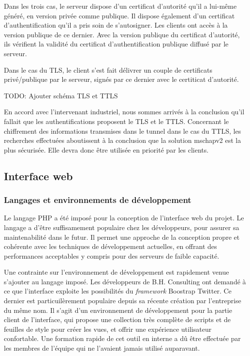 Dans les trois cas, le serveur dispose d'un  certificat d'autorité qu'il a lui-même généré, en version privée comme publique. Il dispose également d'un certificat d'authentification qu'il a pris soin de s'autosigner. Les clients ont accès à la version publique de ce dernier. Avec la version publique du certificat d'autorité, ils vérifient la validité du certificat d'authentification publique diffusé par le serveur.

Dans le cas du TLS, le client s'est fait délivrer un couple de certificats privé/publique par le serveur, signés par ce dernier avec le certiticat d'autorité.

TODO: Ajouter schéma TLS et TTLS

En accord avec l'intervenant industriel, nous sommes arrivés à la conclusion qu'il fallait que les authentifications proposent le TLS et le TTLS. Concernant le chiffrement des informations transmises dans le tunnel dans le cas du TTLS, les recherches effectuées aboutissent à la conclusion que la solution mschapv2 est la plus sécurisée. Elle devra donc être utilisée en priorité par les clients.

\subsection{Interface web}
\subsubsection{Langages et environnements de développement}

Le langage PHP a été imposé pour la conception de l'interface web du projet. Le langage a d'être suffisamement populaire chez les développeurs, pour assurer sa maintenabilité dans le futur. Il permet une approche de la conception propre et cohérente avec les techniques de développement actuelles, en offrant des performances acceptables y compris pour des serveurs de faible capacité.

Une contrainte sur l'environnement de développement est rapidement venue s'ajouter au langage imposé. Les développeurs de B.H. Consulting ont demandé à ce que l'interface exploite les possibilités du \textit{framework} Boostrap Twitter. Ce dernier est particuilèrement populaire depuis sa récente création par l'entreprise du même nom. Il s'agit d'un environnement de développement pour la partie client de l'interface, qui propose une collection très complète de scripts et de feuilles de style pour créer les vues, et offrir une expérience utilisateur confortable. Une formation rapide de cet outil en interne a dû être effectuée par les membres de l'équipe qui ne l'avaient jamais utilisé auparavant.

